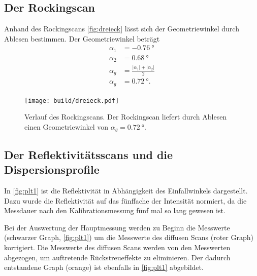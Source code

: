 \subsection*{Der Rockingscan}

Anhand des Rockingscans \autoref{fig:dreieck} lässt sich der Geometriewinkel durch Ablesen bestimmen.
Der Geometriewinkel beträgt
\begin{align*}
    \alpha_1 &= \SI{-0.76}{\degree}\\    
    \alpha_2 &= \SI{0.68}{\degree}\\    
    \alpha_g &= \frac{|\alpha_1|+|\alpha_2|}{2}\\
    \alpha_g &= \SI{0.72}{\degree}.    
\end{align*}
\begin{figure}
    \centering
    \texttt{[image: build/dreieck.pdf]}
    \caption{Verlauf des Rockingscans. Der Rockingscan liefert durch Ablesen einen Geometriewinkel von $\alpha_g = \SI{0.72}{\degree}$.}
    \label{fig:dreieck}
\end{figure}

\subsection{Der Reflektivitätsscans und die Dispersionsprofile}
In \autoref{fig:plt1} ist die Reflektivität in Abhängigkeit des Einfallwinkels dargestellt.
Dazu wurde die Reflektivität auf das fünffache der Intensität normiert, da die Messdauer nach den Kalibrationsmessung fünf mal so lang gewesen ist. 

Bei der Auswertung der Hauptmessung werden zu Beginn die Messwerte (schwarzer Graph, \autoref{fig:plt1}) um die Messwerte des
diffusen Scans (roter Graph) korrigiert. Die Messwerte des diffusen Scans werden von den Messwerten abgezogen, um auftretende Rückstreueffekte zu 
eliminieren. Der dadurch entstandene Graph (orange) ist ebenfalls in \autoref{fig:plt1} abgebildet. 

